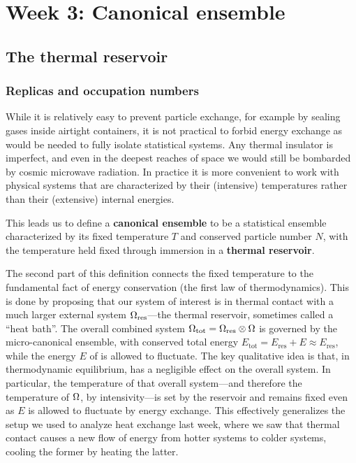 \renewcommand{\thisweek}{MATH327 Week 3}
\renewcommand{\moddate}{Last modified 13 Feb.~2021}
\setcounter{section}{3}
\setcounter{subsection}{0}
{}
\section*{Week 3: Canonical ensemble}

\subsection{The thermal reservoir}
\subsubsection{Replicas and occupation numbers}
While it is relatively easy to prevent particle exchange, for example by sealing gases inside airtight containers, it is not practical to forbid energy exchange as would be needed to fully isolate statistical systems.
Any thermal insulator is imperfect, and even in the deepest reaches of space we would still be bombarded by cosmic microwave radiation.
In practice it is more convenient to work with physical systems that are characterized by their (intensive) temperatures rather than their (extensive) internal energies.

\begin{shaded}
  This leads us to define a \textbf{canonical ensemble} to be a statistical ensemble characterized by its fixed temperature $T$ and conserved particle number $N$, with the temperature held fixed through immersion in a \textbf{thermal reservoir}.
\end{shaded}

The second part of this definition connects the fixed temperature to the fundamental fact of energy conservation (the first law of thermodynamics).
This is done by proposing that our system of interest \Om is in thermal contact with a much larger external system $\Omega_{\text{res}}$---the thermal reservoir, sometimes called a ``heat bath''.
The overall combined system $\Omega_{\text{tot}} = \Omega_{\text{res}} \otimes \Omega$ is governed by the micro-canonical ensemble, with conserved total energy $E_{\text{tot}} = E_{\text{res}} + E \approx E_{\text{res}}$, while the energy $E$ of \Om is allowed to fluctuate.
The key qualitative idea is that, in thermodynamic equilibrium, \Om has a negligible effect on the overall system.
In particular, the temperature of that overall system---and therefore the temperature of $\Omega$, by intensivity---is set by the reservoir and remains fixed even as $E$ is allowed to fluctuate by energy exchange.
This effectively generalizes the setup we used to analyze heat exchange last week, where we saw that thermal contact causes a new flow of energy from hotter systems to colder systems, cooling the former by heating the latter.

